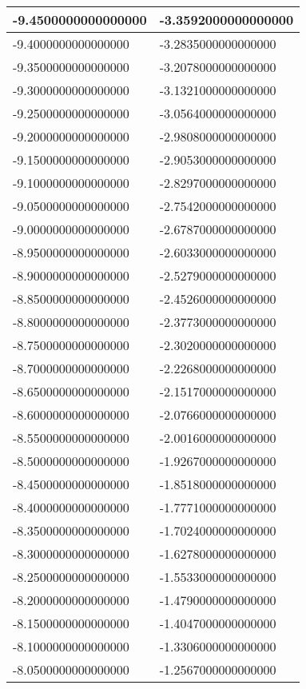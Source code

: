 \documentclass[a4paper,14pt]{article}
\begin{document}
\begin{longtable}{|l|l|}
-9.4500000000000000	&	-3.3592000000000000\\ \hline
-9.4000000000000000	&	-3.2835000000000000\\ \hline
-9.3500000000000000	&	-3.2078000000000000\\ \hline
-9.3000000000000000	&	-3.1321000000000000\\ \hline
-9.2500000000000000	&	-3.0564000000000000\\ \hline
-9.2000000000000000	&	-2.9808000000000000\\ \hline
-9.1500000000000000	&	-2.9053000000000000\\ \hline
-9.1000000000000000	&	-2.8297000000000000\\ \hline
-9.0500000000000000	&	-2.7542000000000000\\ \hline
-9.0000000000000000	&	-2.6787000000000000\\ \hline
-8.9500000000000000	&	-2.6033000000000000\\ \hline
-8.9000000000000000	&	-2.5279000000000000\\ \hline
-8.8500000000000000	&	-2.4526000000000000\\ \hline
-8.8000000000000000	&	-2.3773000000000000\\ \hline
-8.7500000000000000	&	-2.3020000000000000\\ \hline
-8.7000000000000000	&	-2.2268000000000000\\ \hline
-8.6500000000000000	&	-2.1517000000000000\\ \hline
-8.6000000000000000	&	-2.0766000000000000\\ \hline
-8.5500000000000000	&	-2.0016000000000000\\ \hline
-8.5000000000000000	&	-1.9267000000000000\\ \hline
-8.4500000000000000	&	-1.8518000000000000\\ \hline
-8.4000000000000000	&	-1.7771000000000000\\ \hline
-8.3500000000000000	&	-1.7024000000000000\\ \hline
-8.3000000000000000	&	-1.6278000000000000\\ \hline
-8.2500000000000000	&	-1.5533000000000000\\ \hline
-8.2000000000000000	&	-1.4790000000000000\\ \hline
-8.1500000000000000	&	-1.4047000000000000\\ \hline
-8.1000000000000000	&	-1.3306000000000000\\ \hline
-8.0500000000000000	&	-1.2567000000000000\\ \hline

\end{longtable}
\end{document}
